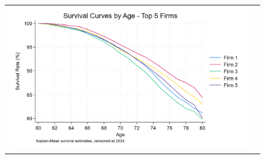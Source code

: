 \documentclass[12pt]{article}
\begin{document}
 
  \begin{figure}[H]
\caption{}
 \label{fig:ie4_14}
\centering{}%
\begin{tabular}{cc}
\includegraphics[scale=0.2]{figures/IE4/IE4_survival_curves_by_age_top_firms.png} 
\end{tabular}
\end{figure} 


\end{document}
